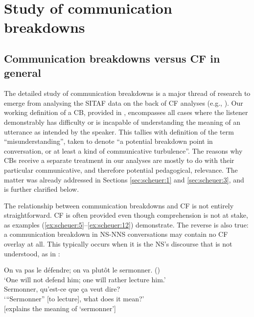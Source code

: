 \documentclass[output=paper,colorlinks,citecolor=brown,modfonts,nonflat]{../langscibook}
\begin{document}
\section{Study of communication breakdowns}\label{sec:scheuer:5}

\subsection{Communication breakdowns versus CF in general}\label{sec:scheuer:5.1}

\largerpage

The detailed study of communication breakdowns is a major thread of research to emerge from analysing the SITAF data on the back of CF analyses (e.g., \citealt{HorguesScheuer2018Breakdown}). Our working definition of a CB, provided in , encompasses all cases where the listener demonstrably has difficulty or is incapable of understanding the meaning of an utterance as intended by the speaker. This tallies with  definition of the term “misunderstanding”, taken to denote “a potential breakdown point in conversation, or at least a kind of communicative turbulence”. The reasons why CBs receive a separate treatment in our analyses are mostly to do with their particular communicative, and therefore potential pedagogical, relevance. The matter was already addressed in Sections \ref{sec:scheuer:1} and \ref{sec:scheuer:3}, and is further clarified below.

The relationship between communication breakdowns and CF is not entirely straightforward. CF is often provided even though comprehension is not at stake, as examples (\ref{ex:scheuer:5}--\ref{ex:scheuer:12}) demonstrate. The reverse is also true: a communication breakdown in NS-NNS conversations may contain no CF overlay at all. This typically occurs when it is the NS’s discourse that is not understood, as in :

\ea\label{ex:scheuer:13}
{\NS} {On} {va} {pas} {le} {défendre;} {on} {va} {plutôt} {le} {sermonner.}  ()\\
{\TRS} ‘One will not defend him; one will rather lecture him.’\\
{\NNS} {Sermonner,} {qu'est-ce} {que} {ça} {veut} {dire?}\\
{\TRS}`{}``Sermonner'' [to lecture], what does it mean?’\\
  {\NS} [explains the meaning of ‘sermonner’]
\z
\end{document}
